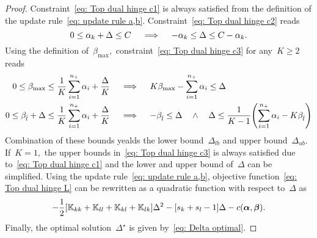 \begin{proof}
  Constraint~\eqref{eq: Top dual hinge c1} is always satisfied from the definition of the update rule~\eqref{eq: update rule a,b}. Constraint~\eqref{eq: Top dual hinge c2} reads
  \begin{equation*}
    0 \leq \alpha_k + \Delta \leq C
    \quad \implies \quad
    - \alpha_k \leq \Delta \leq C - \alpha_k.
  \end{equation*}
  Using the definition of~$\beta_{\max},$ constraint~\eqref{eq: Top dual hinge c3} for any~$K \geq 2$ reads
  \begin{align*}
    0 \leq \beta_{\max} \leq \frac{1}{K} \sum_{i = 1}^{\npos} \alpha_i + \frac{\Delta}{K} 
    & \quad \implies \quad
    K\beta_{\max} - \sum_{i = 1}^{\npos} \alpha_i \leq \Delta \\
    0 \leq \betal + \Delta \leq \frac{1}{K} \sum_{i = 1}^{\npos} \alpha_i + \frac{\Delta}{K}
    & \quad \implies \quad
    -\betal \leq \Delta \quad \land \quad \Delta \leq \frac{1}{K-1}\Brac{\sum_{i = 1}^{\npos} \alpha_i - K \betal}
  \end{align*}
  Combination of these bounds yealds the lower bound~$\Delta_{lb}$ and upper bound~$\Delta_{ub}.$ If~$K = 1,$ the upper bounds in~\eqref{eq: Top dual hinge c3} is always satisfied due to~\eqref{eq: Top dual hinge c1} and the lower and upper bound of~$\Delta$ can be simplified. Using the update rule~\eqref{eq: update rule a,b}, objective function~\eqref{eq: Top dual hinge L} can be rewritten as a quadratic function with respect to~$\Delta$ as
  \begin{equation*}
    - \frac{1}{2} \Brac[s]{\K_{kk} + \K_{ll} + \K_{kl} + \K_{lk}} \Delta^2
    - \Brac[s]{s_k + s_l - 1} \Delta
    - c(\bm{\alpha}, \bm{\beta}).
  \end{equation*}
  Finally, the optimal solution~$\Delta^{\star}$ is given by~\eqref{eq: Delta optimal}.
\end{proof}

